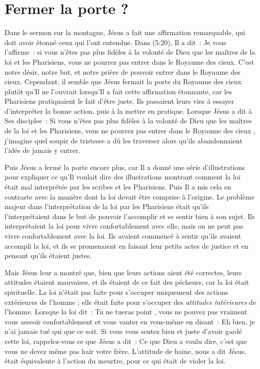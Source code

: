 \section*{Fermer la porte ?}

Dans le sermon sur la montagne, Jésus a fait une affirmation remarquable,
 qui doit avoir étonné ceux qui l'ont entendue.
 Dans (5:20), Il a dit~:
 \og Je vous l'affirme~:
 si vous n'êtes pas plus fidèles à la volonté de Dieu
 que les maîtres de la loi et les Pharisiens,
 vous ne pourrez pas entrer dans le Royaume des cieux. \fg{}
 C'est notre désir, notre but, et notre prière de pouvoir entrer
 dans le Royaume des cieux.
 Cependant, il semble que Jésus fermait la porte du Royaume des cieux
 plutôt qu'Il ne l'ouvrait lorsqu'Il a fait cette affirmation étonnante,
 car les Pharisiens pratiquaient le fait d'être juste.
 Ils passaient leurs vies à essayer d'interpréter la bonne action,
 puis à la mettre en pratique.
 Lorsque Jésus a dit à Ses disciples~:
 \og Si vous n'êtes pas plus fidèles à la volonté de Dieu que
 les maîtres de la loi et les Pharisiens, vous ne pourrez pas
 entrer dans le Royaume des cieux \fg{}, j'imagine quel soupir de tristesse
 a dû les traverser alors qu'ils abandonnaient
 l'idée de jamais y entrer.

Puis Jésus a fermé la porte encore plus,
 car Il a donné une série d'illustrations pour expliquer
 ce qu'Il voulait dire \ocadr des illustrations montrant comment la loi
 était mal interprétée par les scribes et les Pharisiens.
 Puis Il a mis cela en contraste avec la manière dont la loi
 devait être comprise à l'origine.
 Le problème majeur dans l'interpré\-ta\-tion de la loi par les Pharisiens
 était qu'ils l'interprétaient dans le but de pouvoir l'accomplir
 et se sentir bien à son sujet.
 Ils interprétaient la loi pour vivre confortablement avec elle,
 mais on ne peut pas vivre confortablement avec la loi.
 Ils avaient commencé à sentir qu'ils avaient accompli la loi,
 et ils se promenaient en faisant leur petits actes de justice
 et en pensant qu'ils étaient justes.

Mais Jésus leur a montré que, bien que leurs actions
 aient été correctes, leurs attitudes étaient mauvaises,
 et ils étaient de ce fait des pécheurs,
 car la loi était spirituelle.
 La loi n'était pas faite pour s'occuper uniquement des actions extérieures
 de l'homme ; elle était faite pour s'occuper
 des \emph{attitudes intérieures} de l'homme.
 Lorsque la loi dit~: \og Tu ne tueras point \fg{},
 vous ne pouvez pas vraiment vous asseoir confortablement et vous vanter
 en vous-même en disant~:
 \og Eh bien, je n'ai jamais tué qui que ce soit. \fg{}
 Si vous vous sentez bien et juste d'avoir gardé cette loi,
 rappelez-vous ce que Jésus a dit~:
 \og Ce que Dieu a voulu dire, c'est que vous ne devez même pas
 haïr votre frère. \fg{}
 L'attitude de haine, nous a dit Jésus,
 était équivalente à l'action du meurtre,
 pour ce qui était de violer la loi.

